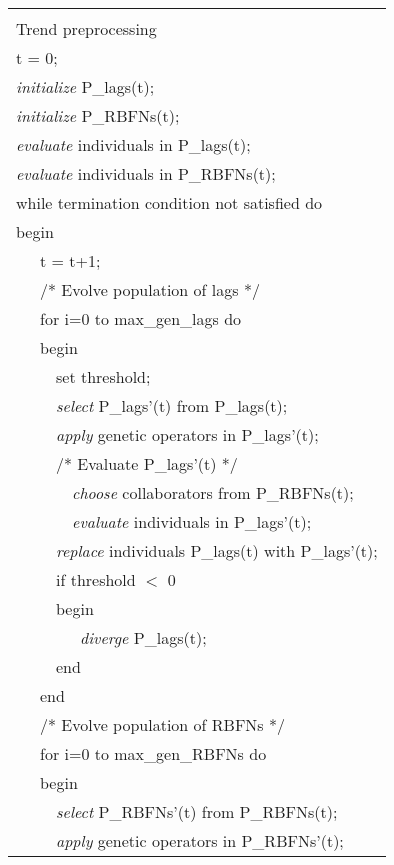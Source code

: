 \documentclass[a4paper,twoside]{article}
\begin{document}

\begin{figure}
\centering
\begin{tabular}{|l|}
\hline
\\
Trend preprocessing \\
t = 0;  \\
\emph{initialize} P\_lags(t); \\
\emph{initialize} P\_RBFNs(t);  \\
\emph{evaluate} individuals in P\_lags(t); \\
\emph{evaluate} individuals in P\_RBFNs(t); \\
while termination condition not satisfied do \\
begin  \\
\ \ \ t = t+1;  \\
\ \ \ /* Evolve population of lags */ \\
\ \ \ for i=0 to max\_gen\_lags do \\
\ \ \ begin  \\
\ \ \ \ \ set threshold;  \\
\ \ \ \ \ \emph{select} P\_lags'(t) from P\_lags(t); \\
\ \ \ \ \ \emph{apply} genetic operators in P\_lags'(t); \\
\ \ \ \ \ /* Evaluate P\_lags'(t) */ \\
\ \ \ \ \ \ \ \emph{choose} collaborators from P\_RBFNs(t); \\
\ \ \ \ \ \ \ \emph{evaluate} individuals in P\_lags'(t); \\
\ \ \ \ \ \emph{replace} individuals P\_lags(t) with P\_lags'(t); \\
\ \ \ \ \ if threshold $<$ 0  \\
\ \ \ \ \ begin  \\
\ \ \ \ \ \ \ \ \emph{diverge} P\_lags(t); \\
\ \ \ \ \ end \\
\ \ \ end  \\
\ \ \ /* Evolve population of RBFNs */ \\
\ \ \ for i=0 to max\_gen\_RBFNs do \\
\ \ \ begin \\
\ \ \ \ \ \emph{select} P\_RBFNs'(t) from P\_RBFNs(t); \\
\ \ \ \ \ \emph{apply} genetic operators in P\_RBFNs'(t); \\

\end{tabular}
\end{figure}
\end{document}

